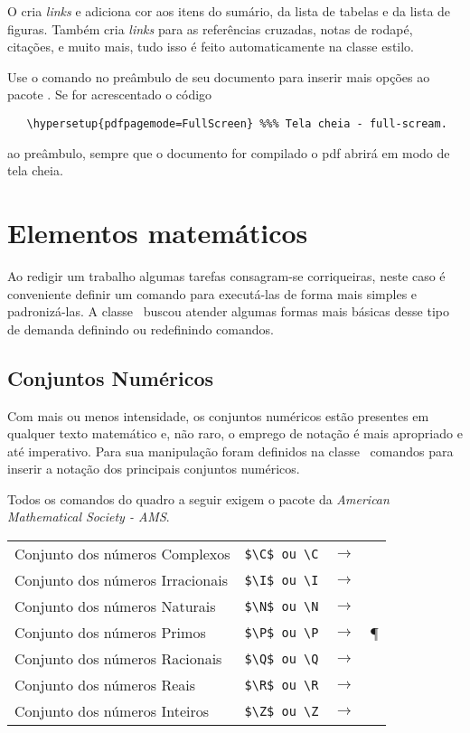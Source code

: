 O  cria {\itshape links} e adiciona cor aos itens do
sumário, da lista de tabelas e da lista de figuras. Também cria
{\itshape links} para as referências cruzadas, notas de rodapé, citações,
e muito mais, tudo isso é feito automaticamente na classe estilo.

Use o comando  no preâmbulo de seu documento para
inserir mais opções ao pacote . Se for acrescentado o código
\begin{tcolorbox}
\begin{lstlisting}
   \hypersetup{pdfpagemode=FullScreen} %%% Tela cheia - full-scream.
\end{lstlisting}
\end{tcolorbox}
ao preâmbulo, sempre que o documento for compilado o pdf abrirá em
modo de tela cheia.

\section{Elementos matemáticos}

Ao redigir um trabalho algumas tarefas consagram-se corriqueiras,
neste caso é conveniente definir um comando para executá-las de
forma mais simples e padronizá-las. A classe \estilo\ buscou
atender algumas formas mais básicas desse tipo de demanda
definindo ou redefinindo comandos.

\subsection{Conjuntos Numéricos}

Com mais ou menos intensidade, os conjuntos numéricos estão
presentes em qualquer texto matemático e, não raro, o emprego
de notação é mais apropriado e até imperativo. Para sua
manipulação foram definidos na classe \estilo\ comandos
para inserir a notação dos principais conjuntos numéricos.

Todos os comandos do quadro a seguir exigem o pacote  da
\emph{American Mathematical Society - AMS}.
\begin{tcolorbox}
	\begin{tabular}{llcl}
	Conjunto dos números Complexos   & \verb|$\C$ ou \C| & $\longrightarrow$ &\C \\
	Conjunto dos números Irracionais & \verb|$\I$ ou \I| & $\longrightarrow$ &\I \\
	Conjunto dos números Naturais    & \verb|$\N$ ou \N| & $\longrightarrow$ &\N \\
	Conjunto dos números Primos      & \verb|$\P$ ou \P| & $\longrightarrow$ &\P \\
	Conjunto dos números Racionais   & \verb|$\Q$ ou \Q| & $\longrightarrow$ &\Q \\
	Conjunto dos números Reais       & \verb|$\R$ ou \R| & $\longrightarrow$ &\R \\
	Conjunto dos números Inteiros    & \verb|$\Z$ ou \Z| & $\longrightarrow$ &\Z
	\end{tabular}
\end{tcolorbox}


